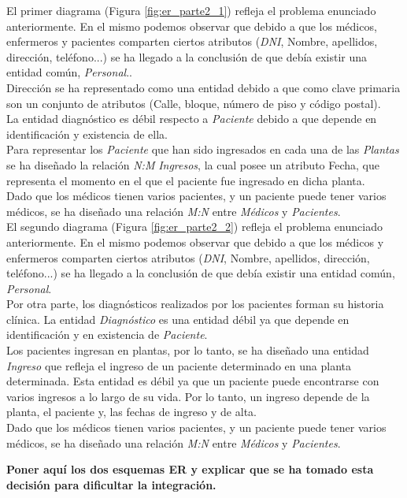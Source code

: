 \documentclass{article}
\begin{document}
El primer diagrama (Figura \ref{fig:er_parte2_1}) refleja el problema enunciado anteriormente. En el mismo podemos observar que debido a que los médicos, enfermeros y pacientes comparten ciertos atributos (\emph{DNI}, Nombre, apellidos, dirección, teléfono...) se ha llegado a la conclusión de que debía existir una entidad común, \emph{Personal}..\\
Dirección se ha representado como una entidad debido a que como clave primaria son un conjunto de atributos (Calle, bloque, número de piso y código postal).\\
La entidad diagnóstico es débil respecto a \emph{Paciente} debido a que depende en identificación y existencia de ella.\\
Para representar los \emph{Paciente} que han sido ingresados en cada una de las \emph{Plantas} se ha diseñado la relación \emph{N:M} \emph{Ingresos}, la cual posee un atributo Fecha, que representa el momento en el que el paciente fue ingresado en dicha planta.\\
Dado que los médicos tienen varios pacientes, y un paciente puede tener varios médicos, se ha diseñado una relación \emph{M:N} entre \emph{Médicos} y \emph{Pacientes}.\\

El segundo diagrama (Figura \ref{fig:er_parte2_2}) refleja el problema enunciado anteriormente. En el mismo podemos observar que debido a que los médicos y enfermeros comparten ciertos atributos (\emph{DNI}, Nombre, apellidos, dirección, teléfono...) se ha llegado a la conclusión de que debía existir una entidad común, \emph{Personal}.\\
Por otra parte, los diagnósticos realizados por los pacientes forman su historia clínica. La entidad \emph{Diagnóstico} es una entidad débil ya que depende en identificación y en existencia de \emph{Paciente}.\\
Los pacientes ingresan en plantas, por lo tanto, se ha diseñado una entidad \emph{Ingreso} que refleja el ingreso de un paciente determinado en una planta determinada. Esta entidad es débil ya que un paciente puede encontrarse con varios ingresos a lo largo de su vida. Por lo tanto, un ingreso depende de la planta, el paciente y, las fechas de ingreso y de alta.\\
Dado que los médicos tienen varios pacientes, y un paciente puede tener varios médicos, se ha diseñado una relación \emph{M:N} entre \emph{Médicos} y \emph{Pacientes}.

\textbf{Poner aquí los dos esquemas ER y explicar que se ha tomado esta decisión para dificultar la integración.}
\end{document}
